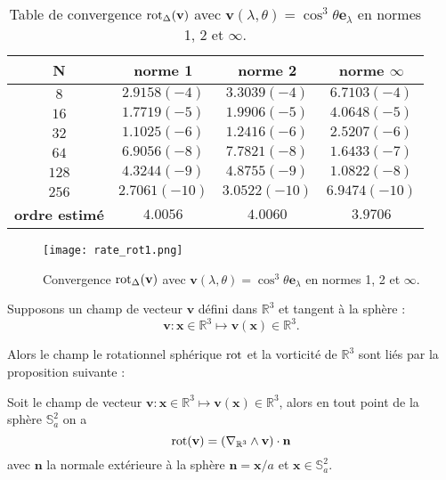\begin{table}[htbp]
\begin{center}
\begin{tabular}{|c||c|c|c|}
\hline
\textbf{N}  & \textbf{norme 1} & \textbf{norme 2} & \textbf{norme $\infty$} \\
\hline
\hline
$8$  & $2.9158(-4)$  & $3.3039(-4)$  & $6.7103(-4)$  \\
$16$ & $1.7719(-5)$  & $1.9906(-5)$  & $4.0648(-5)$  \\
$32$ & $1.1025(-6)$  & $1.2416(-6)$  & $2.5207(-6)$  \\
$64$ & $6.9056(-8)$  & $7.7821(-8)$  & $1.6433(-7)$  \\
$128$& $4.3244(-9)$  & $4.8755(-9)$  & $1.0822(-8)$  \\
$256$& $2.7061(-10)$ & $3.0522(-10)$ & $6.9474(-10)$ \\
\hline 
\hline
\textbf{ordre estimé}& $4.0056$ & $4.0060$ & $3.9706$\\
\hline
\end{tabular}
\end{center}
\caption{Table de convergence $\text{rot}_{\Delta} ( \mathbf{v} )$ avec $\mathbf{v} ( \lambda, \theta ) = \cos^3 \theta \mathbf{e}_{\lambda}$ en normes 1, 2 et $\infty$.}
\label{tab:rate_rot1}
\end{table} 

\begin{figure}[htbp]
\begin{center}
\texttt{[image: rate\_rot1.png]}
\end{center}
\caption{Convergence $\text{rot}_{\Delta} ( \mathbf{v} )$ avec $\mathbf{v} ( \lambda, \theta ) = \cos^3 \theta \mathbf{e}_{\lambda}$ en normes 1, 2 et $\infty$.}
\label{fig:rate_rot1}
\end{figure}


Supposons un champ de vecteur $\mathbf{v}$ défini dans $\mathbb{R}^3$ et tangent à la sphère :
\begin{equation}
\mathbf{v} : \mathbf{x} \in \mathbb{R}^3 \mapsto \mathbf{v}(\mathbf{x}) \in \mathbb{R}^3.
\end{equation}

Alors le champ le rotationnel sphérique $\text{rot}$ et la vorticité de $\mathbb{R}^3$ sont liés par la proposition suivante :

\begin{proposition}
Soit le champ de vecteur $\mathbf{v} : \mathbf{x} \in \mathbb{R}^3 \mapsto \mathbf{v}(\mathbf{x}) \in \mathbb{R}^3$, alors en tout point de la sphère $\mathbb{S}_a^2$ on a
\begin{equation}
\text{rot} (\mathbf{v} ) = \left( \nabla_{\mathbb{R}^3} \wedge \mathbf{v} \right) \cdot \mathbf{n}
\end{equation}
avec $\mathbf{n}$ la normale extérieure à la sphère $\mathbf{n} = \mathbf{x}/a$ et $\mathbf{x} \in \mathbb{S}_a^2$.
\end{proposition}

